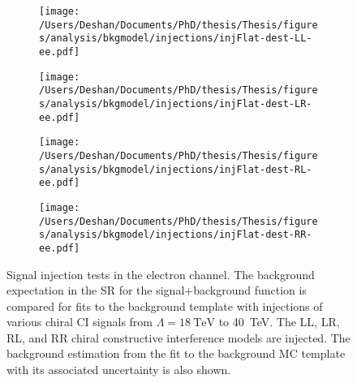 \begin{figure}[h!]
    \centering
    \begin{subfigure}[b]{0.49\textwidth}
        \centering
        \texttt{[image: /Users/Deshan/Documents/PhD/thesis/Thesis/figures/analysis/bkgmodel/injections/injFlat-dest-LL-ee.pdf]}
        \label{fig:bkgmodel:injee2}
    \end{subfigure}
    \begin{subfigure}[b]{0.49\textwidth}
        \centering
        \texttt{[image: /Users/Deshan/Documents/PhD/thesis/Thesis/figures/analysis/bkgmodel/injections/injFlat-dest-LR-ee.pdf]}
        \label{fig:bkgmodel:injee4}
    \end{subfigure}
    \begin{subfigure}[b]{0.49\textwidth}
        \centering
        \texttt{[image: /Users/Deshan/Documents/PhD/thesis/Thesis/figures/analysis/bkgmodel/injections/injFlat-dest-RL-ee.pdf]}
        \label{fig:bkgmodel:injee6}
    \end{subfigure}
    \begin{subfigure}[b]{0.49\textwidth}
        \centering
        \texttt{[image: /Users/Deshan/Documents/PhD/thesis/Thesis/figures/analysis/bkgmodel/injections/injFlat-dest-RR-ee.pdf]}
        \label{fig:bkgmodel:injee8}
    \end{subfigure}
    \caption[Signal injection tests in the electron channel for destructive interference models]{Signal injection tests in the electron channel. The background expectation in the SR for the signal+background function is compared for fits to the background template with injections of various chiral CI signals from $\Lambda = \SI{18}{\tera\electronvolt}$ to \SI{40}{\tera\electronvolt}. The LL, LR, RL, and RR chiral constructive interference models are injected. The background estimation from the fit to the background MC template with its associated uncertainty is also shown.}
    \label{fig:bkgmodel:injeedest}
\end{figure}

